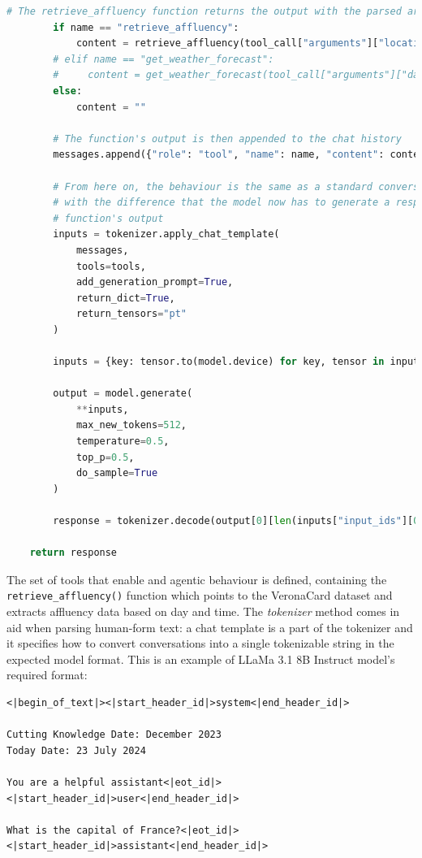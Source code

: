 \begin{center}
\begin{lstlisting}[language=Python, frame=single, caption=\texttt{generate\_response()} Function.]
        # The retrieve_affluency function returns the output with the parsed arguments
        if name == "retrieve_affluency":
            content = retrieve_affluency(tool_call["arguments"]["location"], tool_call["arguments"]["date"])
        # elif name == "get_weather_forecast":
        #     content = get_weather_forecast(tool_call["arguments"]["date"])
        else:
            content = ""

        # The function's output is then appended to the chat history
        messages.append({"role": "tool", "name": name, "content": content})

        # From here on, the behaviour is the same as a standard conversation,
        # with the difference that the model now has to generate a response based on the 
        # function's output
        inputs = tokenizer.apply_chat_template(
            messages,
            tools=tools,
            add_generation_prompt=True,
            return_dict=True,
            return_tensors="pt"
        )

        inputs = {key: tensor.to(model.device) for key, tensor in inputs.items()}

        output = model.generate(
            **inputs,
            max_new_tokens=512,
            temperature=0.5,
            top_p=0.5,
            do_sample=True
        )

        response = tokenizer.decode(output[0][len(inputs["input_ids"][0]):], skip_special_tokens=True)

    return response
\end{lstlisting}
\end{center}

The set of tools that enable and agentic behaviour is defined, containing the \texttt{retrieve\_affluency()} function which points to the VeronaCard dataset and extracts affluency data based on day and time. The \textit{tokenizer} method  comes in aid when parsing human-form text: a chat template is a part of the tokenizer and it specifies how to convert conversations into a single tokenizable string in the expected model format. This is an example of LLaMa 3.1 8B Instruct model's required format:

\begin{Verbatim}[breaklines=true]
<|begin_of_text|><|start_header_id|>system<|end_header_id|>

Cutting Knowledge Date: December 2023
Today Date: 23 July 2024
    
You are a helpful assistant<|eot_id|><|start_header_id|>user<|end_header_id|>
    
What is the capital of France?<|eot_id|><|start_header_id|>assistant<|end_header_id|>
\end{Verbatim}

